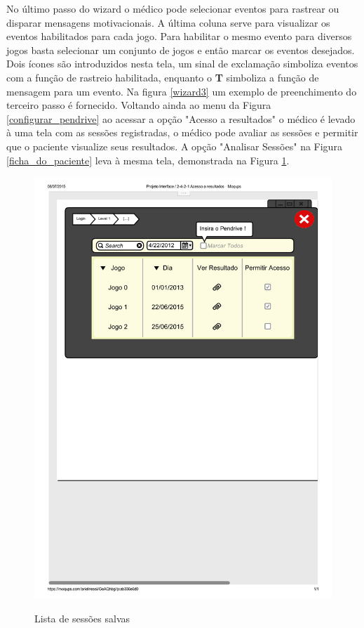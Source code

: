 \documentclass[12pt]{article}
\begin{document}
No último passo do wizard o médico pode selecionar eventos para rastrear ou disparar mensagens motivacionais. A última coluna serve para visualizar os eventos habilitados para cada jogo. Para habilitar o mesmo evento para diversos jogos basta selecionar um conjunto de jogos e então marcar os eventos desejados. Dois ícones são introduzidos nesta tela, um sinal de exclamação simboliza eventos com a função de rastreio habilitada, enquanto o \textbf{T} simboliza a função de mensagem para um evento. Na figura \ref{wizard3} um exemplo de preenchimento do terceiro passo é fornecido.
\newpage
Voltando ainda ao menu da Figura \ref{configurar_pendrive} ao acessar a opção "Acesso a resultados" o médico é levado à uma tela com as sessões registradas, o médico pode avaliar as sessões e permitir que o paciente visualize seus resultados. A opção "Analisar Sessões" na Figura \ref{ficha_do_paciente} leva à mesma tela, demonstrada na Figura \ref{analisar_sessoes}.

\begin{figure}[h]
\centering
\includegraphics[scale=0.6]{imagens/2-4-2-1Acesso_resultados.pdf}
\label{analisar_sessoes}
\caption{Lista de sessões salvas}
\end{figure}
\end{document}
